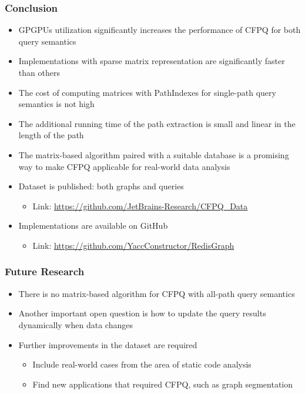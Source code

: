 \documentclass[xcolor=table]{beamer}
\begin{document}
\begin{frame}[fragile] \frametitle{Conclusion}
  \begin{itemize}
    \item GPGPUs utilization significantly increases the performance of CFPQ for both query semantics
    \pause
    \item Implementations with sparse matrix representation are significantly faster than others
    \pause
    \item The cost of computing matrices with PathIndexes for single-path query semantics is not high
    \pause
    \item The additional running time of the path extraction is small and linear in the length of the path
    \pause 
    \item The matrix-based algorithm paired with a suitable database is a promising way to make CFPQ applicable for
    real-world data analysis
  \end{itemize}
  \pause
  \begin{itemize}
    \item Dataset is published: both graphs and queries
    \begin{itemize}
    	\item Link: \url{https://github.com/JetBrains-Research/CFPQ_Data}
    \end{itemize}
    
    \item Implementations are available on GitHub
    \begin{itemize}
    	\item Link: \url{https://github.com/YaccConstructor/RedisGraph}
    \end{itemize}
    
  \end{itemize}
\end{frame}

\begin{frame}[fragile] \frametitle{Future Research}
  \begin{itemize}
  	\item There is no matrix-based algorithm for CFPQ with all-path
  	query semantics
  	\pause
  	\item Another important open question is how to update the
  	query results dynamically when data changes
  	\pause
    \item Further improvements in the dataset are required
    \begin{itemize}
      \item Include real-world cases from
      the area of static code analysis
      \item Find new applications that required CFPQ, such as graph
      segmentation
    \end{itemize}
\end{itemize}
\end{frame}
\end{document}

